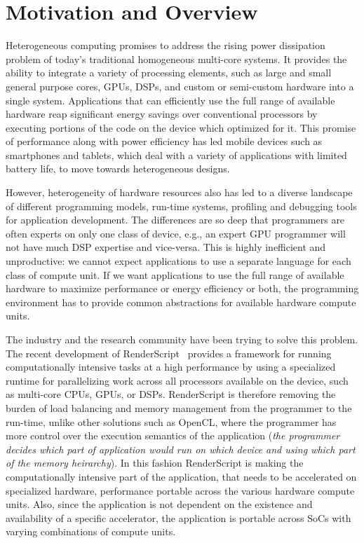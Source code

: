 \section*{Motivation and Overview}
Heterogeneous computing promises to address the rising power dissipation problem
of today's traditional homogeneous multi-core
systems. It provides the ability to integrate a variety of processing elements,
such as large and small general purpose cores, GPUs, DSPs, and custom or
semi-custom hardware into a single system. Applications that can efficiently use
the full range of available hardware reap significant energy
savings over conventional processors by executing portions of the code on the
device which optimized for it. This promise of performance along with power efficiency
has led mobile devices such as smartphones
and tablets, which deal with a variety of applications with limited battery
life, to move towards heterogeneous designs.

However, heterogeneity of hardware resources also has led to a diverse landscape
of different programming models, run-time systems, profiling and debugging tools
for application development. The differences are so deep that programmers are
often experts on only one class of device, e.g., an expert GPU programmer will
not have much DSP expertise and vice-versa. This is highly inefficient and
unproductive: we cannot expect applications to use a separate language for each
class of compute unit. If we want applications to use the full range of
available hardware to maximize performance or energy efficiency or both, the
programming environment has to provide common abstractions for available
hardware compute units.

The industry and the research community have been trying to solve this problem.
The recent development of RenderScript~\cite{wiki:RenderScript, RenderScript} provides a framework
for running computationally intensive tasks at a high performance by using a
specialized runtime for 
parallelizing work across all processors available on the device, such as
multi-core CPUs, GPUs, or DSPs. RenderScript is therefore removing the
burden of load balancing and memory management from the programmer to the run-time, unlike other
solutions such as OpenCL, where the programmer has more control over the
execution semantics of the application ({\em the programmer decides which part
of application would run on which device and using which part of the memory heirarchy}).
In this fashion RenderScript is
making the computationally intensive part of the application, that needs to be
accelerated on specialized hardware, performance portable across the various hardware compute
units. Also, since the application is not dependent on the existence and
availability of a specific accelerator, the application is portable across SoCs
with varying combinations of compute units.

